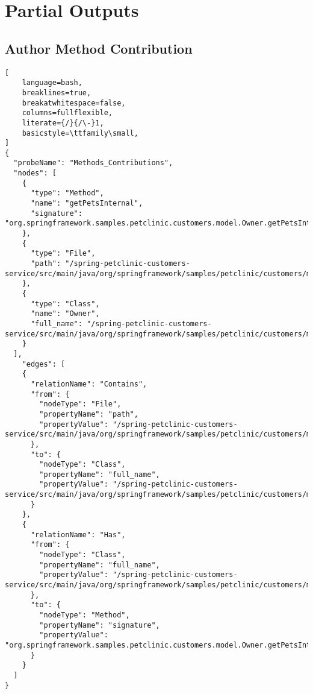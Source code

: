 \chapter{Partial Outputs}\label{appendix_a}

\section{Author Method Contribution}\label{appendix_sec:author_method_contributions}
\begin{lstlisting}[
    language=bash,
    breaklines=true,
    breakatwhitespace=false,
    columns=fullflexible,
    literate={/}{/\-}1,
    basicstyle=\ttfamily\small,
]
{
  "probeName": "Methods_Contributions",
  "nodes": [
    {
      "type": "Method",
      "name": "getPetsInternal",
      "signature": "org.springframework.samples.petclinic.customers.model.Owner.getPetsInternal()"
    },
    {
      "type": "File",
      "path": "/spring-petclinic-customers-service/src/main/java/org/springframework/samples/petclinic/customers/model/Owner.java"
    },
    {
      "type": "Class",
      "name": "Owner",
      "full_name": "/spring-petclinic-customers-service/src/main/java/org/springframework/samples/petclinic/customers/model/Owner.java:Owner"
    }
  ],
    "edges": [
    {
      "relationName": "Contains",
      "from": {
        "nodeType": "File",
        "propertyName": "path",
        "propertyValue": "/spring-petclinic-customers-service/src/main/java/org/springframework/samples/petclinic/customers/model/Owner.java"
      },
      "to": {
        "nodeType": "Class",
        "propertyName": "full_name",
        "propertyValue": "/spring-petclinic-customers-service/src/main/java/org/springframework/samples/petclinic/customers/model/Owner.java:Owner"
      }
    },
    {
      "relationName": "Has",
      "from": {
        "nodeType": "Class",
        "propertyName": "full_name",
        "propertyValue": "/spring-petclinic-customers-service/src/main/java/org/springframework/samples/petclinic/customers/model/Owner.java:Owner"
      },
      "to": {
        "nodeType": "Method",
        "propertyName": "signature",
        "propertyValue": "org.springframework.samples.petclinic.customers.model.Owner.getPetsInternal()"
      }
    }
  ]
}
\end{lstlisting}

